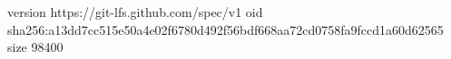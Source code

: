 version https://git-lfs.github.com/spec/v1
oid sha256:a13dd7cc515e50a4e02f6780d492f56bdf668aa72cd0758fa9fccd1a60d62565
size 98400
